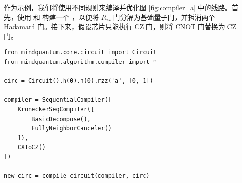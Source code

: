 作为示例，我们将使用不同规则来编译并优化图 \ref{fig:compiler_a} 中的线路。首先，使用 \BasicDecompose 和 \FullyNeighborCanceler 构建一个 \KroneckerSeqCompiler，以便将 $R_\text{zz}$ 门分解为基础量子门，并抵消两个 Hadamard 门。接下来，假设芯片只能执行 CZ 门，则将 CNOT 门替换为 CZ 门。
\begin{lstlisting}
from mindquantum.core.circuit import Circuit
from mindquantum.algorithm.compiler import *

circ = Circuit().h(0).h(0).rzz('a', [0, 1])

compiler = SequentialCompiler([
    KroneckerSeqCompiler([
        BasicDecompose(),
        FullyNeighborCanceler()
    ]),
    CXToCZ()
])

new_circ = compile_circuit(compiler, circ)
\end{lstlisting}
